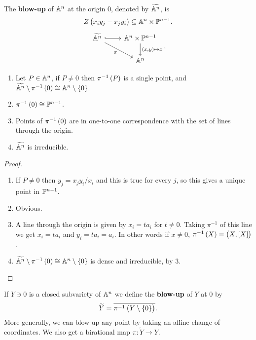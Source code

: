 \pagebreak

\begin{definition}
The \textbf{blow-up} of $ \AA^n $ at the origin $ 0 $, denoted by $ \widetilde{\AA^n} $, is
$$ Z\br{x_iy_j - x_jy_i} \subseteq \AA^n \times \PP^{n - 1}. $$
$$
\begin{tikzcd}
\widetilde{\AA^n} \arrow[hookrightarrow]{r} \arrow[swap]{dr}{\pi} & \AA^n \times \PP^{n - 1} \arrow{d}{\br{x, y} \mapsto x} \\
& \AA^n
\end{tikzcd}.
$$
\end{definition}

\begin{proposition}
\hfill
\begin{enumerate}
\item Let $ P \in \AA^n $, if $ P \ne 0 $ then $ \pi^{-1}\br{P} $ is a single point, and $ \widetilde{\AA^n} \setminus \pi^{-1}\br{0} \cong \AA^n \setminus \cbr{0} $.
\item $ \pi^{-1}\br{0} \cong \PP^{n - 1} $.
\item Points of $ \pi^{-1}\br{0} $ are in one-to-one correspondence with the set of lines through the origin.
\item $ \widetilde{\AA^n} $ is irreducible.
\end{enumerate}
\end{proposition}

\begin{proof}
\hfill
\begin{enumerate}
\item If $ P \ne 0 $ then $ y_j = x_jy_i/x_i $ and this is true for every $ j $, so this gives a unique point in $ \PP^{n - 1} $.
\item Obvious.
\item A line through the origin is given by $ x_i = ta_i $ for $ t \ne 0 $. Taking $ \pi^{-1} $ of this line we get $ x_i = ta_i $ and $ y_i = ta_i = a_i $. In other words if $ x \ne 0 $, $ \pi^{-1}\br{X} = \br{X, \sbr{X}} $.
\item $ \widetilde{\AA^n} \setminus \pi^{-1}\br{0} \cong \AA^n \setminus \cbr{0} $ is dense and irreducible, by $ 3 $.
\end{enumerate}
\end{proof}

\begin{definition}
If $ Y \ni 0 $ is a closed subvariety of $ \AA^n $ we define the \textbf{blow-up} of $ Y $ at $ 0 $ by
$$ \widetilde{Y} = \overline{\pi^{-1}\br{Y \setminus \cbr{0}}}. $$
More generally, we can blow-up any point by taking an affine change of coordinates. We also get a birational map $ \pi : \widetilde{Y} \to Y $.
\end{definition}


